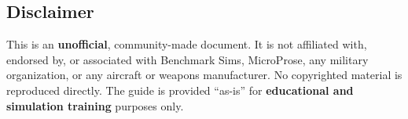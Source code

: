 \documentclass[11pt, a4paper, twoside]{report}
\begin{document}
\subsection{Disclaimer}
\label{sec:C1-S4-S5}

This is an \textbf{unofficial}, community-made document. It is not affiliated with, endorsed by, or associated with Benchmark Sims, MicroProse, any military organization, or any aircraft or weapons manufacturer. No copyrighted material is reproduced directly. The guide is provided ``as-is'' for \textbf{educational and simulation training} purposes only.

\newpage
\end{document}
